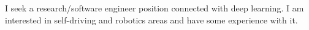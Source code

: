 I seek a research/software engineer position connected with deep learning. I am interested in self-driving and robotics areas and have some experience with it.
